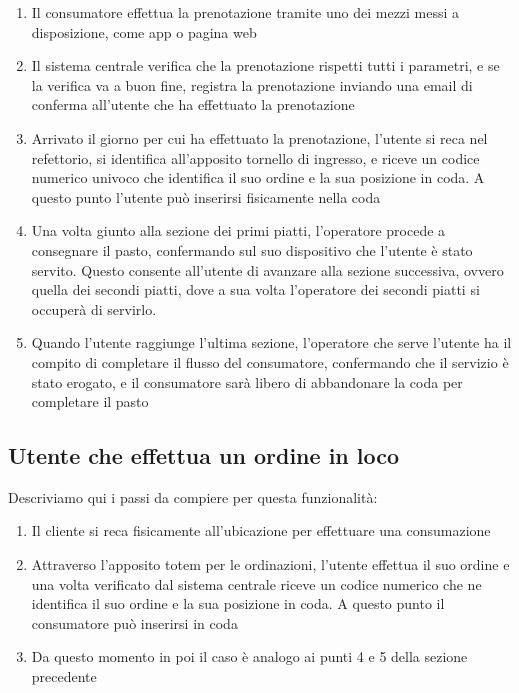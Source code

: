 \documentclass[a4paper, titlepage, 12pt, openright, twoside]{book}
\begin{document}
\begin{enumerate}
	\item Il consumatore effettua la prenotazione tramite uno dei mezzi messi a disposizione, come app o pagina web
	\item Il sistema centrale verifica che la prenotazione rispetti tutti i parametri, e se la verifica va a buon fine, registra la prenotazione
		  inviando una email di conferma all'utente che ha effettuato la prenotazione
	\item Arrivato il giorno per cui ha effettuato la prenotazione, l'utente si reca nel refettorio, si identifica all'apposito tornello di ingresso,
		  e riceve un codice numerico univoco che identifica il suo ordine e la sua posizione in coda. A questo punto l'utente può inserirsi fisicamente nella coda
	\item Una volta giunto alla sezione dei primi piatti, l'operatore procede a consegnare il pasto, confermando sul suo dispositivo che l'utente è stato servito.
		  Questo consente all'utente di avanzare alla sezione successiva, ovvero quella dei secondi piatti, dove a sua volta l'operatore dei secondi piatti si occuperà di servirlo.
	\item Quando l'utente raggiunge l'ultima sezione, l'operatore che serve l'utente ha il compito di completare il flusso del consumatore, confermando che il servizio è stato erogato, e il consumatore sarà libero di abbandonare la coda per completare il pasto
\end{enumerate}

\subsection{Utente che effettua un ordine in loco}

Descriviamo qui i passi da compiere per questa funzionalità:

\begin{enumerate}
	\item Il cliente si reca fisicamente all'ubicazione per effettuare una consumazione
	\item Attraverso l'apposito totem per le ordinazioni, l'utente effettua il suo ordine e una volta verificato dal sistema centrale riceve un codice numerico che ne identifica il suo ordine e la sua posizione in coda. A questo punto il consumatore può inserirsi in coda
	\item Da questo momento in poi il caso è analogo ai punti 4 e 5 della sezione precedente
\end{enumerate}
\end{document}
